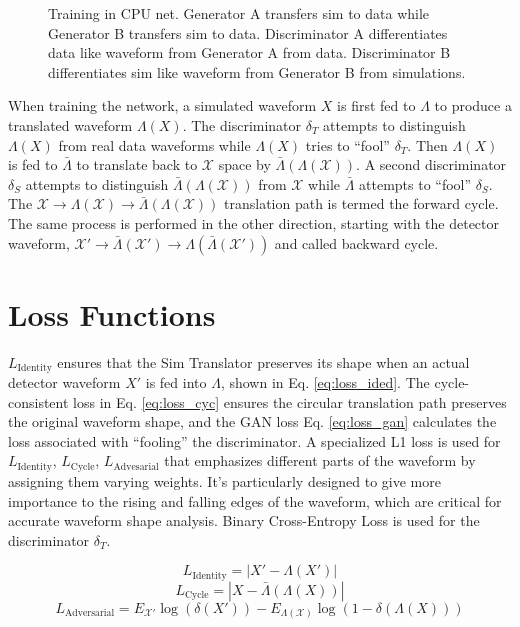 \begin{figure}[htb!]
    \caption{Training in CPU net. Generator A transfers sim to data while Generator B transfers sim to data. Discriminator A differentiates data like waveform from Generator A from data. Discriminator B differentiates sim like waveform from Generator B from simulations.}
   \label{fig:network_training}
\end{figure}


When training the network, a simulated waveform $X$ is first fed to $\Lambda$ to produce a translated waveform $\Lambda(X)$. The discriminator $\delta_{T}$ attempts to distinguish $\Lambda(X)$ from real data waveforms while $\Lambda(X)$ tries to “fool” $\delta_{T}$. Then $\Lambda(X)$ is fed to $\bar{\Lambda}$ to translate back to $\mathcal{X}$ space by $\bar{\Lambda}(\Lambda(\mathcal{X}))$. A second discriminator $\delta_{S}$ attempts to distinguish $\bar{\Lambda}(\Lambda(\mathcal{X}))$ from $\mathcal{X}$ while $\bar{\Lambda}$ attempts to ``fool'' $\delta_{S}$. The $\mathcal{X}\rightarrow{}\Lambda(\mathcal{X})\rightarrow{}\bar{\Lambda}(\Lambda(\mathcal{X}))$ translation path is termed the forward cycle. The same process is performed in the other direction, starting with the detector waveform, $\mathcal{X}'\rightarrow{}\bar{\Lambda}(\mathcal{X}')\rightarrow{}\Lambda(\bar{\Lambda}(\mathcal{X}'))$ and called backward cycle.

\section{Loss Functions}
$L_{\mathrm{Identity}}$ ensures that the Sim Translator preserves its shape when an actual detector waveform $X'$ is fed into $\Lambda$, shown in Eq. \ref{eq:loss_ided}. The cycle-consistent loss in Eq. \ref{eq:loss_cyc} ensures the circular translation path preserves the original waveform shape, and the GAN loss Eq. \ref{eq:loss_gan} calculates the loss associated with ``fooling'' the discriminator. A specialized L1 loss is used for $L_{\mathrm{Identity}}$, $L_{\mathrm{Cycle}}$, $L_{\mathrm{Advesarial}}$ that emphasizes different parts of the waveform by assigning them varying weights. It's particularly designed to give more importance to the rising and falling edges of the waveform, which are critical for accurate waveform shape analysis. Binary Cross-Entropy Loss is used for the discriminator $\delta_{T}$.

\begin{equation}\label{eq:loss_ided}
    L_{\mathrm{Identity}} = |X' - \Lambda(X')|
\end{equation}
\begin{equation}\label{eq:loss_cyc}
    L_{\mathrm{Cycle}} = |X - \bar{\Lambda}(\Lambda(X))|
\end{equation}
\begin{equation}\label{eq:loss_gan}
    L_{\mathrm{Adversarial}} = E_{\mathcal{X'}}\log(\delta(X')) - E_{\Lambda(\mathcal{X})}\log(1 - \delta(\Lambda(X)))
\end{equation}

